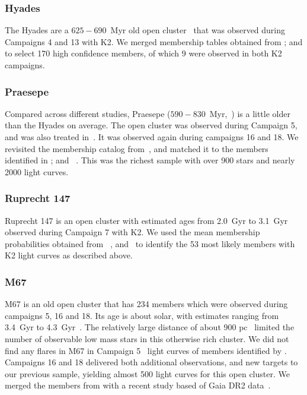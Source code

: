 \documentclass{aa}
\begin{document}
\subsubsection{Hyades}
The Hyades are a $625-690$~Myr old open cluster~\citep{perryman1998,salaris_age_2004, gossage2018, gaia_dr2_2018_hrd} that was observed during Campaigns 4 and 13 with K2.  We merged membership tables obtained from \citet{douglas_praesepe_hyades_2014, reino_hyades_2018}; and \citet{gaia_dr2_2018_hrd} to select 170 high confidence members, of which 9 were observed in both K2 campaigns. 
\subsubsection{Praesepe}
Compared across different studies, Praesepe ($590-830$~Myr,~\citealt{salaris_age_2004, boudreault_astrometric_2012, scholz2015, yen2018, gossage2018, bossini2019}) is a little older than the Hyades on average. The open cluster was observed during Campaign 5, and was also treated in~. It was observed again during campaigns 16 and 18. We revisited the membership catalog from~\citet{douglas_praesepe_hyades_2014}, and matched it to the members identified in \citet{douglas_poking_2017, rebull_praesepe_2017,cantat_gaudin_2018}; and ~\citet{gaia_dr2_2018_hrd}. This was the richest sample with over 900 stars and nearly 2000 light curves.
\subsubsection{Ruprecht 147}
Ruprecht 147 is an open cluster with estimated ages from 2.0~Gyr to 3.1~Gyr~\citep{curtis2013,scholz2015,gaia_dr2_2018_hrd,torres2018} observed during Campaign 7 with K2. We used the mean membership probabilities obtained from ~\citet{curtis2013, cantat_gaudin_2018, olivares_ngc6774_2019}, and~\citet{gaia_dr2_2018_hrd} to identify the 53 most likely members with K2 light curves as described above.
\subsubsection{M67}
M67 is an old open cluster that has 234 members which were observed during campaigns 5, 16 and 18. Its age is about solar, with estimates ranging from 3.4~Gyr to 4.3~Gyr~\citep{salaris_age_2004, onehag2011, dias_fitting_2012, scholz2015, barnes_rotation_2016, bossini2019}. The relatively large distance of about 900 pc~\citep{dias_fitting_2012} limited the number of observable low mass stars in this otherwise rich cluster. We did not find any flares in M67 in Campaign 5~ light curves of members identified by \citet{gonzalez_m67mem_2016}. Campaigns 16 and 18 delivered both additional observations, and new targets to our previous sample, yielding almost 500 light curves for this open cluster. We merged the members from \citet{gonzalez_m67mem_2016} with a recent study based of Gaia DR2 data~\citep{gao_m67mem_2018}.
\end{document}
